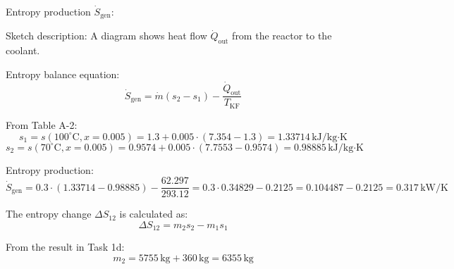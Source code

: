 Entropy production \( \dot{S}_{\text{gen}} \):  

Sketch description: A diagram shows heat flow \( \dot{Q}_{\text{out}} \) from the reactor to the coolant.  

Entropy balance equation:  
\[
\dot{S}_{\text{gen}} = \dot{m} \left( s_2 - s_1 \right) - \frac{\dot{Q}_{\text{out}}}{T_{\text{KF}}}
\]  

From Table A-2:  
\[
s_1 = s(100^\circ\text{C}, x=0.005) = 1.3 + 0.005 \cdot (7.354 - 1.3) = 1.33714 \, \text{kJ/kg·K}
\]  
\[
s_2 = s(70^\circ\text{C}, x=0.005) = 0.9574 + 0.005 \cdot (7.7553 - 0.9574) = 0.98885 \, \text{kJ/kg·K}
\]  

Entropy production:  
\[
\dot{S}_{\text{gen}} = 0.3 \cdot (1.33714 - 0.98885) - \frac{62.297}{293.12} = 0.3 \cdot 0.34829 - 0.2125 = 0.104487 - 0.2125 = 0.317 \, \text{kW/K}
\]

The entropy change \( \Delta S_{12} \) is calculated as:  
\[
\Delta S_{12} = m_2 s_2 - m_1 s_1
\]

From the result in Task 1d:  
\[
m_2 = 5755 \, \text{kg} + 360 \, \text{kg} = 6355 \, \text{kg}
\]